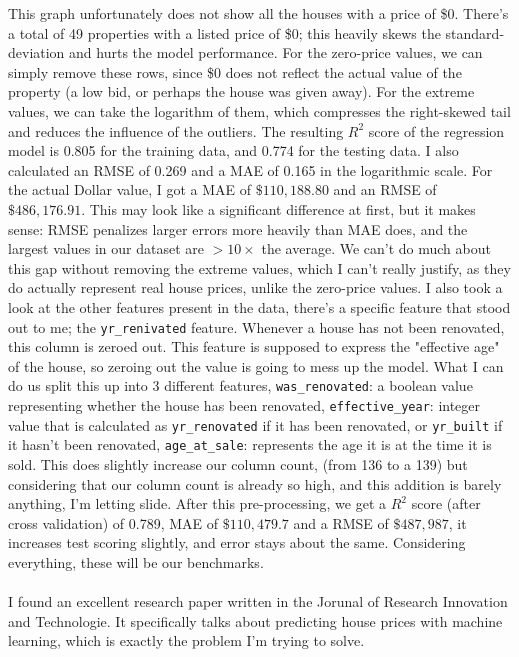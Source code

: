 \documentclass[14pt]{article}
\begin{document}
This graph unfortunately does not show all the houses with a price of \$0. There's a total of 49 properties with a listed price of \$0; this heavily skews the standard-deviation and hurts the model performance.
For the zero-price values, we can simply remove these rows, since \$0 does not reflect the actual value of the property (a low bid, or perhaps the house was given away).
For the extreme values, we can take the logarithm of them, which compresses the right-skewed tail and reduces the influence of the outliers. The resulting $R^2$ score of the regression model is 0.805 for the training data, and 0.774 for the testing data.
I also calculated an RMSE of 0.269 and a MAE of 0.165 in the logarithmic scale. For the actual Dollar value, I got a MAE of $\$110{,}188.80$ and an RMSE of $\$486{,}176.91$.
	This may look like a significant difference at first, but it makes sense: RMSE penalizes larger errors more heavily than MAE does, and the largest values in our dataset are $>10\times$ the average. We can't do much about this gap without removing the extreme values,
	which I can't really justify, as they do actually represent real house prices, unlike the zero-price values.
	I also took a look at the other features present in the data, there's a specific feature that stood out to me; the \texttt{yr\_renivated} feature. Whenever a house has not been renovated, this column is zeroed out.
	This feature is supposed to express the "effective age" of the house, so zeroing out the value is going to mess up the model. What I can do us split this up into 3 different features, \texttt{was\_renovated}: a boolean value representing whether the house has been renovated,
	\texttt{effective\_year}: integer value that is calculated as \texttt{yr\_renovated} if it has been renovated, or \texttt{yr\_built} if it hasn't been renovated, \texttt{age\_at\_sale}: represents the age it is at the time it is sold.
	This does slightly increase our column count, (from 136 to a 139) but considering that our column count is already so high, and this addition is barely anything, I'm letting slide.
	After this pre-processing, we get a $R^2$ score (after cross validation) of 0.789, MAE of $\$110{,}479.7$ and a RMSE of $\$487{,}987$, it increases test scoring slightly, and error stays about the same.
	Considering everything, these will be our benchmarks.
	\\\\
	I found an excellent research paper written in the Jorunal of Research Innovation and Technologie\cite{Housing-ML}. It specifically talks about predicting house prices with machine learning, which is exactly the problem I'm trying to solve.
\end{document}
